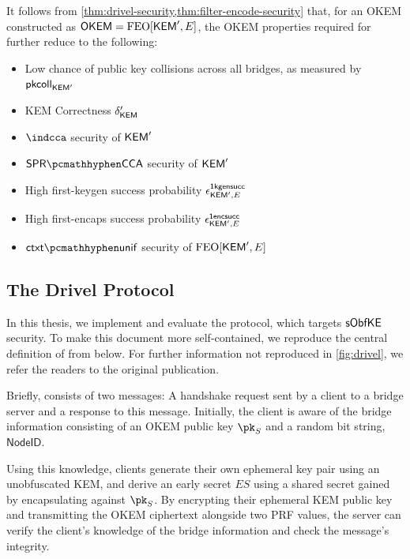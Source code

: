 \begin{corollary}
\label{cor:drivel-security-filter-encode}
    It follows from \cref{thm:drivel-security,thm:filter-encode-security} that, for an OKEM constructed as $\mathsf{OKEM} = \textsf{\textnormal{FEO}}[\mathsf{KEM}',E]$, the OKEM properties required for \drivel{} further reduce to the following:
    \begin{itemize}
        \item Low chance of public key collisions across all bridges, as measured by $\mathsf{pkcoll}_{\mathsf{KEM}'}$
        \item KEM Correctness $\delta_{\mathsf{KEM}}'$
        \item $\indcca$ security of $\mathsf{KEM}'$
        \item $\sprcca$ security of $\mathsf{KEM}'$
        \item High first-keygen success probability $\epsilon^{\mathsf{1kgensucc}}_{\mathsf{KEM}',E}$
        \item High first-encaps success probability $\epsilon^{\mathsf{1encsucc}}_{\mathsf{KEM}',E}$
        \item $\ctxtunif$ security of $\textsf{\textnormal{FEO}}[\mathsf{KEM}',E]$
    \end{itemize}
\end{corollary}

\subsection{The Drivel Protocol}

In this thesis, we implement and evaluate the \drivel{} protocol, which targets $\mathsf{sObfKE}$ security.
To make this document more self-contained, we reproduce the central definition of \drivel{} from \cite[Fig.~6]{EPRINT:GRSV25} below.
For further information not reproduced in \cref{fig:drivel}, we refer the readers to the original publication.

Briefly, \drivel{} consists of two messages: A handshake request sent by a client to a bridge server and a response to this message.
Initially, the client is aware of the bridge information consisting of an OKEM public key $\pk_S$ and a random bit string, $\mathsf{NodeID}$.

Using this knowledge, clients generate their own ephemeral key pair using an unobfuscated KEM, and derive an early secret $ES$ using a shared secret gained by encapsulating against $\pk_S$. By encrypting their ephemeral KEM public key and transmitting the OKEM ciphertext alongside two PRF values, the server can verify the client's knowledge of the bridge information and check the message's integrity.

